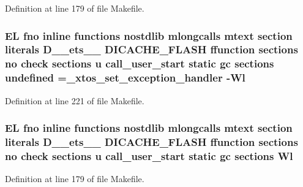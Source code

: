 Definition at line 179 of file Makefile.

\hypertarget{Makefile_a9324bb2c20136255586f3b51593c4291}{
\subsubsection[{undefined}]{\setlength{\rightskip}{0pt plus 5cm}E\-L fno inline functions nostdlib mlongcalls mtext section literals D\-\_\-\-\_\-ets\-\_\-\-\_\- D\-I\-C\-A\-C\-H\-E\-\_\-\-F\-L\-A\-S\-H ffunction sections no check sections u call\-\_\-user\-\_\-start static gc sections undefined =\-\_\-xtos\-\_\-set\-\_\-exception\-\_\-handler -\/{\bf Wl}\hspace{0.3cm}{\ttfamily [static]}}}\label{Makefile_a9324bb2c20136255586f3b51593c4291}


Definition at line 221 of file Makefile.

\hypertarget{Makefile_afb1782b240d70229ae5bc6b111f9794a}{
\subsubsection[{Wl}]{\setlength{\rightskip}{0pt plus 5cm}E\-L fno inline functions nostdlib mlongcalls mtext section literals D\-\_\-\-\_\-ets\-\_\-\-\_\- D\-I\-C\-A\-C\-H\-E\-\_\-\-F\-L\-A\-S\-H ffunction sections no check sections u call\-\_\-user\-\_\-start static gc sections Wl}}\label{Makefile_afb1782b240d70229ae5bc6b111f9794a}


Definition at line 179 of file Makefile.

